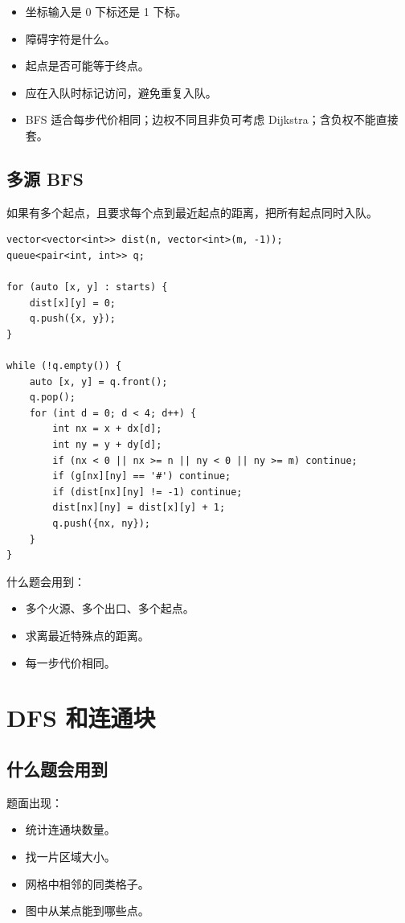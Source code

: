\begin{itemize}
  \item 坐标输入是 0 下标还是 1 下标。
  \item 障碍字符是什么。
  \item 起点是否可能等于终点。
  \item 应在入队时标记访问，避免重复入队。
  \item BFS 适合每步代价相同；边权不同且非负可考虑 Dijkstra；含负权不能直接套。
\end{itemize}

\subsection{多源 BFS}

如果有多个起点，且要求每个点到最近起点的距离，把所有起点同时入队。

\begin{lstlisting}
vector<vector<int>> dist(n, vector<int>(m, -1));
queue<pair<int, int>> q;

for (auto [x, y] : starts) {
    dist[x][y] = 0;
    q.push({x, y});
}

while (!q.empty()) {
    auto [x, y] = q.front();
    q.pop();
    for (int d = 0; d < 4; d++) {
        int nx = x + dx[d];
        int ny = y + dy[d];
        if (nx < 0 || nx >= n || ny < 0 || ny >= m) continue;
        if (g[nx][ny] == '#') continue;
        if (dist[nx][ny] != -1) continue;
        dist[nx][ny] = dist[x][y] + 1;
        q.push({nx, ny});
    }
}
\end{lstlisting}

什么题会用到：

\begin{itemize}
  \item 多个火源、多个出口、多个起点。
  \item 求离最近特殊点的距离。
  \item 每一步代价相同。
\end{itemize}

\section{DFS 和连通块}\label{sec:06-19}

\subsection{什么题会用到}

题面出现：

\begin{itemize}
  \item 统计连通块数量。
  \item 找一片区域大小。
  \item 网格中相邻的同类格子。
  \item 图中从某点能到哪些点。
\end{itemize}

